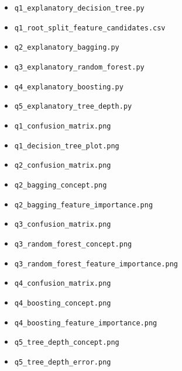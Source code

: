 \documentclass[12pt,a4paper]{article}
\newcommand{\code}[1]{\texttt{\textenglish{#1}}}
\begin{document}
\begin{itemize}
    \item \code{q1\_explanatory\_decision\_tree.py}
    \item \code{q1\_root\_split\_feature\_candidates.csv}
    \item \code{q2\_explanatory\_bagging.py}
    \item \code{q3\_explanatory\_random\_forest.py}
    \item \code{q4\_explanatory\_boosting.py}
    \item \code{q5\_explanatory\_tree\_depth.py}
    \item \code{q1\_confusion\_matrix.png}
    \item \code{q1\_decision\_tree\_plot.png}
    \item \code{q2\_confusion\_matrix.png}
    \item \code{q2\_bagging\_concept.png}
    \item \code{q2\_bagging\_feature\_importance.png}
    \item \code{q3\_confusion\_matrix.png}
    \item \code{q3\_random\_forest\_concept.png}
    \item \code{q3\_random\_forest\_feature\_importance.png}
    \item \code{q4\_confusion\_matrix.png}
    \item \code{q4\_boosting\_concept.png}
    \item \code{q4\_boosting\_feature\_importance.png}
    \item \code{q5\_tree\_depth\_concept.png}
    \item \code{q5\_tree\_depth\_error.png}
\end{itemize}
\end{document}
